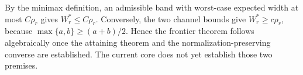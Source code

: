 By the minimax definition, an admissible band with worst-case expected width at most \(C\rho_r\) gives \(W_r^*\le C\rho_r\).  Conversely, the two channel bounds give \(W_r^*\ge c\rho_r\), because \(\max\{a,b\}\ge(a+b)/2\).  Hence the frontier theorem follows algebraically once the attaining theorem and the normalization-preserving converse are established.  The current core does not yet establish those two premises.